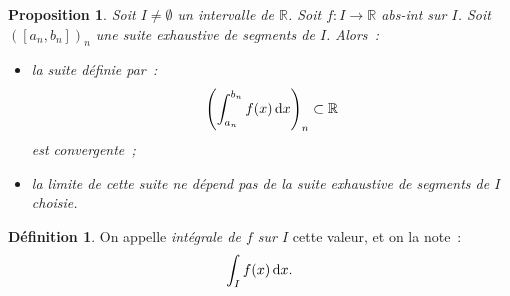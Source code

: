 \documentclass{report}
\newtheorem{prp}[thm]{Proposition}
\theoremstyle{definition}
\newtheorem{déf}[thm]{Définition}
\theoremstyle{remark}
\numberwithin{equation}{section}
\newcommand{\R}{\mathbb R}
\begin{document}
			\begin{prp}\label{prp:abs-int => convergence} Soit $I \neq \emptyset$ un intervalle de $\R$. Soit $f : I \to \R$ abs-int sur $I$. Soit $([a_n, b_n])_n$
			une suite exhaustive de 	segments de $I$. Alors~:
			\begin{itemize}
				\item[$(i)$]  la suite définie par~:
				\begin{equation}
					\left(\int_{a_n}^{b_n}f(x)\dif x\right)_n \subset \R
				\end{equation}
				est convergente~;
				\item[$(ii)$] la limite de cette suite ne dépend pas de la suite exhaustive de segments de $I$ choisie.
			\end{itemize}
			\end{prp}

			\begin{déf} On appelle \textit{intégrale de $f$ sur $I$} cette valeur, et on la note~:
			\begin{equation}
				\int_I f(x)\dif x.
			\end{equation}
			\end{déf}
\end{document}
